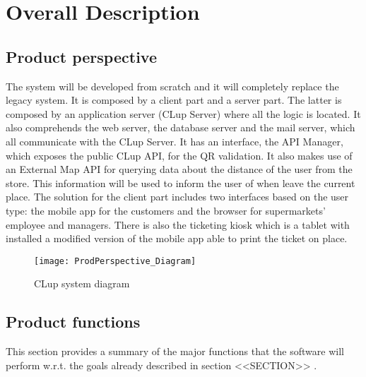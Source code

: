 \chapter{Overall Description}

\section{Product perspective}

The system will be developed from scratch and it will completely replace the legacy system. \newline
It is composed by a client part and a server part.
The latter is composed by an application server (CLup Server) where all the logic is located. It also comprehends the web server, the database server and the mail server,
which all communicate with the CLup Server.
It has an interface, the API Manager, which exposes the public CLup API, for the QR validation. It also makes use of an External Map API for querying data about the 
distance of the user from the store. This information will be used to inform the user of when leave the current place.\newline
The solution for the client part includes two interfaces based on the user type: the mobile app for the customers and the browser for supermarkets' employee and managers.
There is also the ticketing kiosk which is a tablet with installed a modified version of the mobile app able to print the ticket on place.
\begin{figure}[H]
	\centering
	\texttt{[image: ProdPerspective\_Diagram]}
	\caption{CLup system diagram}	
\end{figure}	 

\section{Product functions}
This section provides a summary of the major functions that the software will perform w.r.t. the goals already described in section <<SECTION>> .

